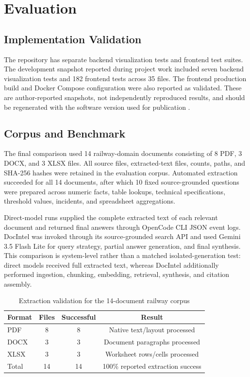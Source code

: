 \documentclass[conference]{IEEEtran}
\begin{document}
\section{Evaluation}
\subsection{Implementation Validation}
The repository has separate backend visualization tests and frontend test suites. The development snapshot reported during project work included seven backend visualization tests and 182 frontend tests across 35 files. The frontend production build and Docker Compose configuration were also reported as validated. These are author-reported snapshots, not independently reproduced results, and should be regenerated with the software version used for publication \cite{docintel}.

\subsection{Corpus and Benchmark}
The final comparison used 14 railway-domain documents consisting of 8 PDF, 3 DOCX, and 3 XLSX files. All source files, extracted-text files, counts, paths, and SHA-256 hashes were retained in the evaluation corpus. Automated extraction succeeded for all 14 documents, after which 10 fixed source-grounded questions were prepared across numeric facts, table lookups, technical specifications, threshold values, incidents, and spreadsheet aggregations.

Direct-model runs supplied the complete extracted text of each relevant document and returned final answers through OpenCode CLI JSON event logs. DocIntel was invoked through its source-grounded search API and used Gemini 3.5 Flash Lite for query strategy, partial answer generation, and final synthesis. This comparison is system-level rather than a matched isolated-generation test: direct models received full extracted text, whereas DocIntel additionally performed ingestion, chunking, embedding, retrieval, synthesis, and citation assembly.

\begin{table}[!t]
\centering
\caption{Extraction validation for the 14-document railway corpus}
\label{tab:extract}
\small
\begin{tabular}{lccc}
\toprule
\rowcolor{docintelLightBlue}
Format & Files & Successful & Result \\
\midrule
PDF & 8 & 8 & Native text/layout processed \\
DOCX & 3 & 3 & Document paragraphs processed \\
XLSX & 3 & 3 & Worksheet rows/cells processed \\
\midrule
Total & 14 & 14 & 100\% reported extraction success \\
\bottomrule
\end{tabular}
\end{table}
\end{document}
